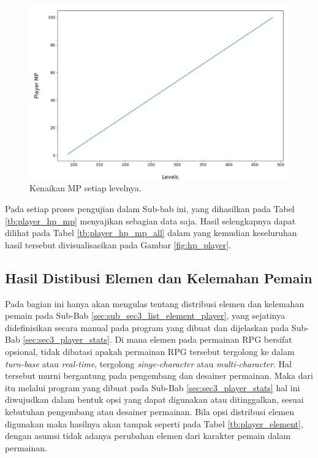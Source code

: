 \begin{figure} [!h] \centering
	\includegraphics[scale=0.44]{img/PlayerMpDistrib.png}
	\caption{Kenaikan MP setiap levelnya.}
	\label{fig:mp_player}
\end{figure}

Pada setiap proses pengujian dalam Sub-bab ini, yang dihasilkan pada Tabel \ref{tb:player_hp_mp} menyajikan sebagian data saja. Hasil selengkapnya dapat dilihat pada Tabel \ref{tb:player_hp_mp_all} dalam  yang kemudian keseluruhan hasil tersebut divisualisasikan pada Gambar \ref{fig:hp_player}.
\vspace{1ex}

\subsection{Hasil Distibusi Elemen dan Kelemahan Pemain}
\label{sec:sub_sec4_eval_dist_element_single-character}
\vspace{1ex}

Pada bagian ini hanya akan mengulas tentang distribusi elemen dan kelemahan pemain pada Sub-Bab \ref{sec:sub_sec3_list_element_player}, yang sejatinya didefinisikan secara manual pada program yang dibuat dan dijelaskan pada Sub-Bab \ref{sec:sec3_player_stats}. Di mana elemen pada permainan RPG bersifat opsional, tidak dibatasi apakah permainan RPG tersebut tergolong ke dalam \textit{turn-base} atau \textit{real-time}, tergolong \textit{singe-character} atau \textit{multi-character}. Hal tersebut murni bergantung pada pengembang dan desainer permainan. Maka dari itu melalui program yang dibuat pada Sub-Bab \ref{sec:sec3_player_stats} hal ini diwujudkan dalam bentuk opsi yang dapat digunakan atau ditinggalkan, sesuai kebutuhan pengembang atau desainer permainan. Bila opsi distribusi elemen digunakan maka hasilnya akan tampak seperti pada Tabel \ref{tb:player_element}, dengan asumsi tidak adanya perubahan elemen dari karakter pemain dalam permainan.
\vspace{-1ex}

